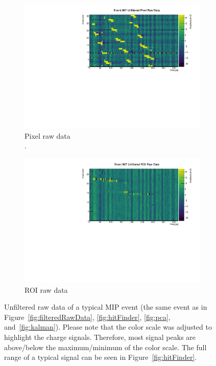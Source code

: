 \documentclass[instruments,article,accept,moreauthors,pdftex]{Definitions/mdpi}
\begin{document}
\begin{figure}[H]
	\centering
	\begin{subfigure}{\textwidth}
		\centering
		\includegraphics[viewport=0 0 550 290, clip, width=\textwidth]{event967_rawUnfilteredPixel}
		\caption{Pixel raw data\\.}
		\label{fig:unfilteredRawData_a}
	\end{subfigure}
	\begin{subfigure}{\textwidth}
		\centering
		\includegraphics[viewport=0 0 550 290, clip, width=\textwidth]{event967_rawUnfilteredROI}
		\caption{ROI raw data}
		\label{fig:unfilteredRawData_b}
	\end{subfigure}
	\caption{Unfiltered raw data of a typical MIP event (the same event as in Figure~\ref{fig:filteredRawData}, \ref{fig:hitFinder}, \ref{fig:pca}, and~\ref{fig:kalman}). 
		Please note that the color scale was adjusted to highlight the charge signals.
		Therefore, most signal peaks are above/below the maximum/minimum of the color scale.
		The full range of a typical signal can be seen in Figure~\ref{fig:hitFinder}.}
	\label{fig:unfilteredRawData}
\end{figure}
\end{document}
